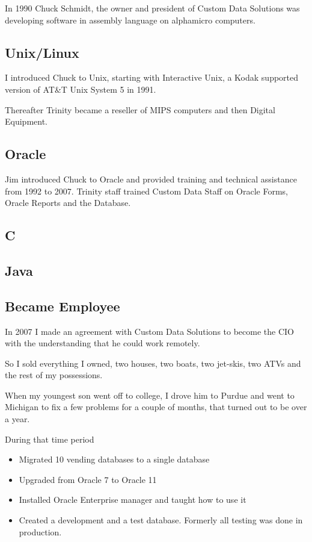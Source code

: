 \documentclass[letterpaper,10pt,english]{sphinxmanual}
\begin{document}
In 1990 Chuck Schmidt, the owner and president of Custom Data Solutions was
developing software in assembly language on alphamicro computers.


\subsection{Unix/Linux}
\label{\detokenize{Contributions:unix-linux}}
I introduced Chuck to Unix, starting with Interactive Unix, a Kodak supported
version of AT\&T Unix System 5 in 1991.

Thereafter Trinity became a reseller of MIPS computers and then
Digital Equipment.


\subsection{Oracle}
\label{\detokenize{Contributions:oracle}}
Jim introduced Chuck to Oracle and provided training and technical assistance
from 1992 to 2007. Trinity staff trained Custom Data Staff on Oracle Forms,
Oracle Reports and the Database.


\subsection{C}
\label{\detokenize{Contributions:c}}

\subsection{Java}
\label{\detokenize{Contributions:java}}

\subsection{Became Employee}
\label{\detokenize{Contributions:became-employee}}
In 2007 I made an agreement with Custom Data Solutions to become
the CIO with the understanding that he could work remotely.

So I sold everything I owned, two houses, two boats, two jet-skis, two ATVs
and the rest of my possessions.

When my youngest son went off to college, I drove him to Purdue and
went to Michigan to fix a few problems for a couple of months, that
turned out to be over a year.

During that time period
\begin{itemize}
\item {} 
Migrated 10 vending databases to a single database

\item {} 
Upgraded from Oracle 7 to Oracle 11

\item {} 
Installed Oracle Enterprise manager and taught how to use it

\item {} 
Created a development and a test database. Formerly all testing was done in production.

\end{itemize}
\end{document}
